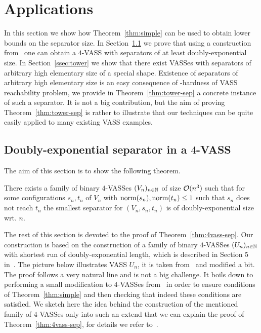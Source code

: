 \section{Applications}\label{sec:applications}
In this section we show how Theorem~\ref{thm:simple} can be used to obtain lower bounds
on the separator size. In Section~\ref{ssec:4vass} we prove that using a construction from~\cite{DBLP:conf/concur/Czerwinski0LLM20}
one can obtain a $4$-VASS with separators of at least doubly-exponential size. 
In Section~\ref{ssec:tower} we show that there exist VASSes with separators of arbitrary high elementary size
of a special shape. Existence of separators of arbitrary high elementary size is an easy consequence
of \tower-hardness of VASS reachability problem, we provide in Theorem~\ref{thm:tower-sep}
a concrete instance of such a separator. It is not a big contribution, but the aim of proving Theorem~\ref{thm:tower-sep}
is rather to illustrate that our techniques can be quite easily applied to many existing VASS examples.

\subsection{Doubly-exponential separator in a $4$-VASS}\label{ssec:4vass}
The aim of this section is to show the following theorem.

\begin{theorem}\label{thm:4vass-sep}
There exists a family of binary $4$-VASSes $(V_n)_{n \in \mathbb{N}}$ of size $\mathcal{O}(n^3)$
such that for some configurations $s_n, t_n$ of $V_n$ with $\textup{norm}(s_n), \textup{norm}(t_n) \leq 1$
such that $s_n$ does not reach $t_n$ the smallest
separator for $(V_n, s_n, t_n)$ is of doubly-exponential size wrt. $n$.
\end{theorem}

The rest of this section is devoted to the proof of Theorem~\ref{thm:4vass-sep}.
Our construction is based on the construction of a family of binary $4$-VASSes $(U_n)_{n \in \mathbb{N}}$
with shortest run of doubly-exponential length,
which is described in Section 5 in~\cite{DBLP:conf/concur/Czerwinski0LLM20}.
The picture below illustrates VASS $U_n$, it is taken from~\cite{DBLP:conf/concur/Czerwinski0LLM20} and modified a bit.
The proof follows a very natural line and is not a big challenge.
It boils down to performing a small modification to $4$-VASSes from~\cite{DBLP:conf/concur/Czerwinski0LLM20}
in order to ensure conditions of Theorem~\ref{thm:simple} and then checking that indeed these
conditions are satisfied. We sketch here the idea behind the construction of the mentioned family of $4$-VASSes
only into such an extend that we can explain the proof of Theorem~\ref{thm:4vass-sep},
for details we refer to~\cite{DBLP:conf/concur/Czerwinski0LLM20}.


